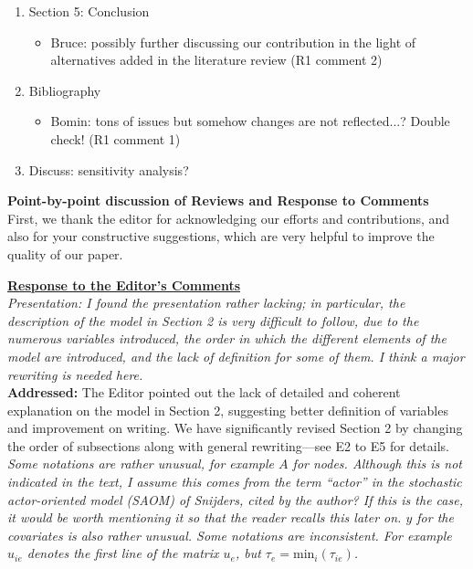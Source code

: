\documentclass[12pt]{article}
\newcommand{\grey}[1]{{\color{mygrey}#1}}
\theoremstyle{definition}
\begin{document}
\begin{enumerate}
				\item Section 5: Conclusion
				\begin{itemize}
					\item Bruce: possibly further discussing our contribution in the light of alternatives added in the literature review (R1 comment 2)
				\end{itemize}			
					
					\item Bibliography
					\begin{itemize}
						\item Bomin: tons of issues but somehow changes are not reflected...? Double check! (R1 comment 1)
					\end{itemize}	
					
					\item Discuss: sensitivity analysis?					
\end{enumerate}

\fi

\noindent \textbf{Point-by-point discussion of Reviews and Response to Comments}\\

First, we thank the editor for acknowledging our efforts and contributions, and also for your constructive suggestions, which are very helpful to improve the quality of our paper. 

\bigskip
\bigskip


\noindent \underline{\textbf{Response to the Editor's Comments}}\\

 \grey{\emph{Presentation: I found the presentation rather lacking; in particular, the description of the model in Section 2 is very difficult to follow, due to the numerous variables introduced, the order in which the different elements of the model are introduced, and the lack of definition for some of them. I think a major rewriting is needed here. }}\\

\noindent \textcolor{MyGreen}{\textbf{Addressed:}} The Editor pointed out the lack of detailed and coherent explanation on the model in Section 2, suggesting better definition of variables and improvement on writing. We have significantly revised Section 2 by changing the order of subsections along with general rewriting---see E2 to E5 for details. \\

 \grey{\emph{Some notations are rather unusual, for example $A$ for nodes. Although this is not indicated in the text, I assume this comes from the term ``actor'' in the stochastic actor-oriented model (SAOM) of Snijders, cited by the author? If this is the case, it would be worth mentioning it so that the reader recalls this later on. $y$ for the covariates is also rather unusual. Some notations are inconsistent. For example $u_{ie}$ denotes the first line of the matrix $u_e$, but $\tau_e = \text{min}_i(\tau_{ie})$. }}\\
\end{document}
